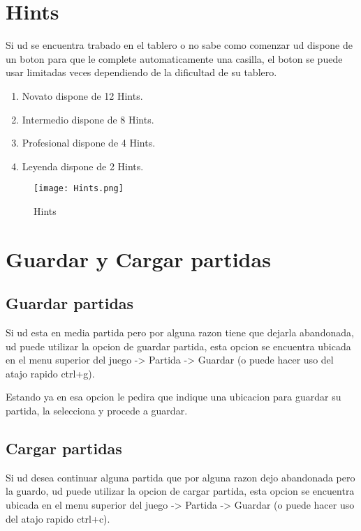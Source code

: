 \documentclass[11pt,fleqn]{book} %
\begin{document}
\section{Hints}

Si ud se encuentra trabado en el tablero o no sabe como comenzar ud dispone de un boton para que le complete automaticamente una casilla, el boton se puede usar limitadas veces dependiendo de la dificultad de su tablero.

\begin{enumerate}
\item Novato dispone de 12 Hints.
\item Intermedio dispone de 8 Hints.
\item Profesional dispone de 4 Hints.
\item Leyenda dispone de 2 Hints.
\end{enumerate}

\begin{figure}[H]
\centering\texttt{[image: Hints.png]}
\caption{Hints}
\end{figure}

\section{Guardar y Cargar partidas}

\subsection{Guardar partidas}

Si ud esta en media partida pero por alguna razon tiene que dejarla abandonada, ud puede utilizar la opcion de guardar partida, esta opcion se encuentra ubicada en el menu superior del juego -> Partida -> Guardar (o puede hacer uso del atajo rapido ctrl+g).



Estando ya en esa opcion le pedira que indique una ubicacion para guardar su partida, la selecciona y procede a guardar.

\subsection{Cargar partidas}

Si ud desea continuar alguna partida que por alguna razon dejo abandonada pero la guardo, ud puede utilizar la opcion de cargar partida, esta opcion se encuentra ubicada en el menu superior del juego -> Partida -> Guardar (o puede hacer uso del atajo rapido ctrl+c).
\end{document}
